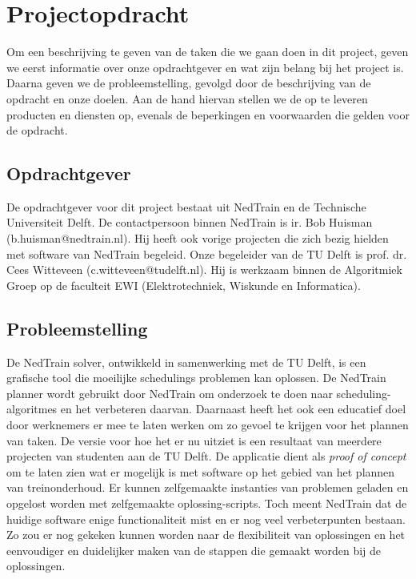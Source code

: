 \section{Projectopdracht}
Om een beschrijving te geven van de taken die we gaan doen in dit project, geven we eerst informatie over onze opdrachtgever en wat zijn belang bij het project is. Daarna geven we de probleemstelling, gevolgd door de beschrijving van de opdracht en onze doelen. Aan de hand hiervan stellen we de op te leveren producten en diensten op, evenals de beperkingen en voorwaarden die gelden voor de opdracht.

\subsection{Opdrachtgever}
De opdrachtgever voor dit project bestaat uit NedTrain en de Technische Universiteit Delft.
De contactpersoon binnen NedTrain is ir. Bob Huisman (b.huisman@nedtrain.nl). Hij heeft ook vorige projecten die zich bezig hielden met software van NedTrain begeleid. Onze begeleider van de TU Delft is prof. dr. Cees Witteveen (c.witteveen@tudelft.nl). Hij is werkzaam binnen de Algoritmiek Groep op de faculteit EWI (Elektrotechniek, Wiskunde en Informatica).

\subsection{Probleemstelling}
De NedTrain solver, ontwikkeld in samenwerking met de TU Delft, is een grafische tool die moeilijke schedulings problemen kan oplossen. De NedTrain planner wordt gebruikt door NedTrain om onderzoek te doen naar scheduling-algoritmes en het verbeteren daarvan. Daarnaast heeft het ook een educatief doel door werknemers er mee te laten werken om zo gevoel te krijgen voor het plannen van taken. De versie voor hoe het er nu uitziet is een resultaat van meerdere projecten van studenten aan de TU Delft. De applicatie dient als \emph{proof of concept} om te laten zien wat er mogelijk is met software op het gebied van het plannen van treinonderhoud. Er kunnen zelfgemaakte instanties van problemen geladen en opgelost worden met zelfgemaakte oplossing-scripts. Toch meent NedTrain dat de huidige software enige functionaliteit mist en er nog veel verbeterpunten bestaan. Zo zou er nog gekeken kunnen worden naar de flexibiliteit van oplossingen en het eenvoudiger en duidelijker maken van de stappen die gemaakt worden bij de oplossingen. 

